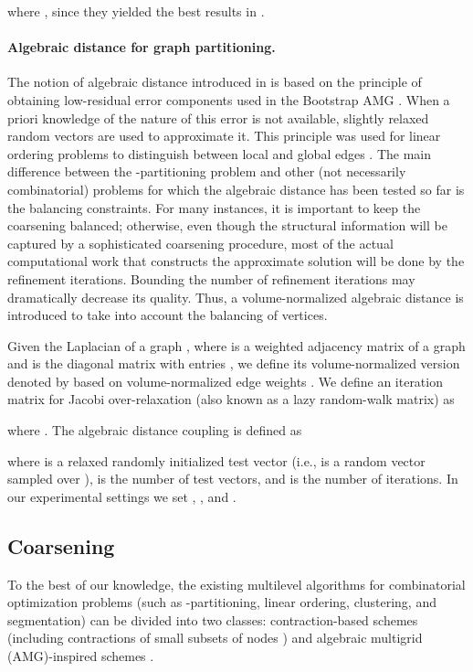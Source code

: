 \documentclass{llncs}
\begin{document}
where , since they yielded the best results in \cite{kappa}. 
\paragraph*{Algebraic distance for graph partitioning.} The notion of algebraic distance introduced in \cite{safro:relaxml,chen-safro-algdist-full} is based on the principle of obtaining low-residual error components used in the Bootstrap AMG \cite{bamg-review}. 
When a priori knowledge of the nature of this error is not available, slightly relaxed random vectors are used to approximate it. This principle was used for linear ordering problems to distinguish between local and global edges \cite{safro:relaxml}. The main difference between the -partitioning problem and other (not necessarily combinatorial) problems for which the algebraic distance has been tested so far is the balancing constraints. For many instances, it is important to keep the coarsening balanced; otherwise, even though the structural information will be captured by a sophisticated coarsening procedure, most of the actual computational work that constructs the approximate solution will be done by the refinement iterations. Bounding the number of refinement iterations may dramatically decrease its quality. 
Thus, a volume-normalized algebraic distance is introduced 
to take into account the balancing of vertices. 
\par Given the Laplacian of a graph , where  is a weighted adjacency matrix of a graph and  is the diagonal matrix with entries , we define its volume-normalized version denoted by  based on volume-normalized edge weights . We define an iteration matrix  for Jacobi over-relaxation (also known as a lazy random-walk matrix) as

where . The algebraic distance coupling  is defined as

where  is a relaxed randomly initialized test vector (i.e.,  is a random vector sampled over \text{[-1/2, 1/2]}),  is the number of test vectors, and  is the number of iterations. In our experimental settings we set , , and .

\subsection{Coarsening}
\par To the best of our knowledge, the existing multilevel algorithms for combinatorial optimization problems (such as -partitioning, linear ordering, clustering, and segmentation) can be divided into two classes: contraction-based schemes \cite{kaffpa,Dhillon05afast,KarypisK95} (including contractions of small subsets of nodes \cite{BartelGKM10}) and algebraic multigrid (AMG)-inspired schemes \cite{safro:relaxml,Hu:wavefront,sharon,doritpart}.
\end{document}
